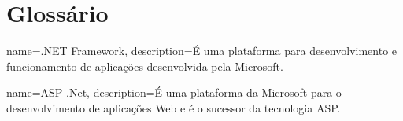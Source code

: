 \chapter*{Glossário}
\makeglossaries

{
  name={.NET Framework},
  description={É uma plataforma para desenvolvimento e funcionamento de aplicações desenvolvida pela Microsoft.}
}

{
  name={ASP .Net},
  description={É uma plataforma da Microsoft para o desenvolvimento de aplicações Web e é o sucessor da tecnologia ASP.}
}

